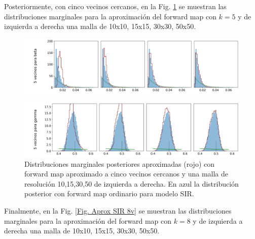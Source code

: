 Posteriormente, con cinco vecinos cercanos, en la Fig. \ref{Fig. Aprox SIR 5v} se muestran las distribuciones marginales para la aproximación del forward map con $k = 5$ y de izquierda a derecha una malla de 10x10, 15x15, 30x30, 50x50.

\begin{figure}[H] 
    \centering 
    \includegraphics[width = 17 cm ]{img/Exp_Central_SIR_Sigma/Figuras/Generales/Convergencia_theta1_2_SIR_sigma.png} 
\end{figure} 
\begin{figure}[H] 
    \centering 
    \includegraphics[width = 17 cm ]{img/Exp_Central_SIR_Sigma/Figuras/Generales/Convergencia_theta2_2_SIR_sigma.png} 
    \caption{Distribuciones marginales posteriores aproximadas (rojo) con forward map aproximado a cinco vecinos cercanos y una malla de resolución 10,15,30,50 de izquierda a derecha. En azul la distribución posterior con forward map ordinario para modelo SIR.}
    \label{Fig. Aprox SIR 5v} 
\end{figure} 

Finalmente, en la Fig. \ref{Fig. Aprox SIR 8v} se muestran las distribuciones marginales para la aproximación del forward map con $k = 8$ y de izquierda a derecha una malla de 10x10, 15x15, 30x30, 50x50.

